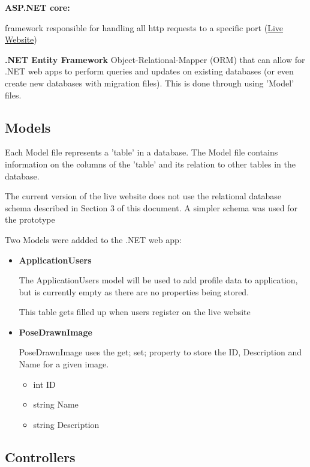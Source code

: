 \documentclass{scrreprt}
\begin{document}
\textbf{ASP.NET core:}

framework responsible for handling all http requests to a specific port (\href{https://brendanduke.ca}{Live Website})

\textbf{.NET Entity Framework}
Object-Relational-Mapper (ORM) that can allow for .NET web apps to perform
queries and updates on existing databases (or even create new databases with
migration files). This is done through using 'Model' files.

\subsection{Models}

Each Model file represents a 'table' in a database. The Model file contains
information on the columns of the 'table' and its relation to other tables in
the database.

The current version of the live website does not use the relational database
schema described in Section 3 of this document. A simpler schema was used for
the prototype

Two Models were addded to the .NET web app:

\begin{itemize}
        \item \textbf{ApplicationUsers}

                The ApplicationUsers model will be used to add profile data to
                application, but is currently empty as there are no properties
                being stored.

                This table gets filled up when users register on the live website

        \item \textbf{PoseDrawnImage}

                PoseDrawnImage uses the {get; set;} property to store the ID, Description
                and Name for a given image.

                \begin{itemize}
                        \item int ID
                        \item string Name
                        \item string Description
                \end{itemize}

\end{itemize}

\subsection{Controllers}
\end{document}
